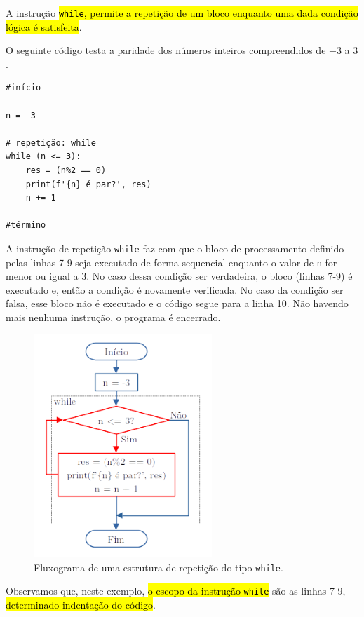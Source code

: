 A instrução \hl{{\lstinline+while+}, permite a repetição de um bloco enquanto uma dada condição lógica é satisfeita}.

\begin{ex}\label{cap_progest_sec_est:ex:while}
  O seguinte código testa a paridade dos números inteiros compreendidos de $-3$ a $3$.
\begin{lstlisting}
#início

n = -3

# repetição: while
while (n <= 3):
    res = (n%2 == 0)
    print(f'{n} é par?', res)
    n += 1
    
#término
\end{lstlisting}
  A instrução de repetição \lstinline+while+ faz com que o bloco de processamento definido pelas linhas 7-9 seja executado de forma sequencial enquanto o valor de \lstinline+n+ for menor ou igual a 3. No caso dessa condição ser verdadeira, o bloco (linhas 7-9) é executado e, então a condição é novamente verificada. No caso da condição ser falsa, esse bloco não é executado e o código segue para a linha 10. Não havendo mais nenhuma instrução, o programa é encerrado.

  \begin{figure}[H]
    \centering
    \includegraphics[width=0.6\textwidth]{./cap_progest/dados/fig_fg_while/fig}
    \caption{Fluxograma de uma estrutura de repetição do tipo \lstinline+while+.}
    \label{cap_progest_sec_est:fig:fg_while}
  \end{figure}

  Observamos que, neste exemplo, \hl{o escopo da instrução {\lstinline+while+}} são as linhas 7-9, \hl{determinado indentação do código}.
\end{ex}

